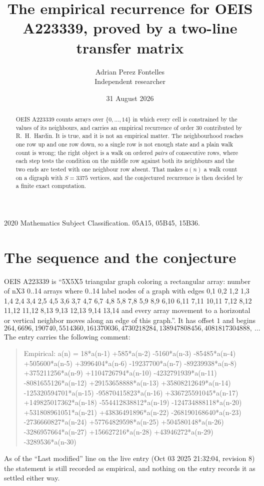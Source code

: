 \documentclass[11pt,a4paper]{article}
\title{The empirical recurrence for OEIS A223339, proved by a two-line transfer matrix}
\author{Adrian Perez Fontelles\\ \small Independent researcher}
\date{31 August 2026}
\theoremstyle{plain}
\theoremstyle{definition}
\begin{document}
\maketitle

\begin{abstract}
OEIS A223339 counts arrays over $\{0,\dots,14\}$ in which every cell is constrained by the
values of its neighbours, and carries an empirical recurrence of order $30$ contributed
by R.~H.~Hardin. It is true, and it is not an empirical matter. The neighbourhood reaches one
row up and one row down, so a single row is not enough state and a plain walk count
is wrong; the right object is a walk on ordered \emph{pairs} of consecutive rows, where
each step tests the condition on the middle row against both its neighbours and the two
ends are tested with one neighbour row absent. That makes $a(n)$ a walk count on a digraph
with $S=3375$ vertices, and the conjectured recurrence is then decided by a finite exact
computation.
\end{abstract}

\noindent\small 2020 Mathematics Subject Classification. 05A15, 05B45, 15B36.\normalsize

\section{The sequence and the conjecture}

OEIS A223339 is ``5X5X5 triangular graph coloring a rectangular array: number of nX3 0..14 arrays where 0..14 label nodes of a graph with edges 0,1 0,2 1,2 1,3 1,4 2,4 3,4 2,5 4,5 3,6 3,7 4,7 6,7 4,8 5,8 7,8 5,9 8,9 6,10 6,11 7,11 10,11 7,12 8,12 11,12 11,12 8,13 9,13 12,13 9,14 13,14 and every array movement to a horizontal or vertical neighbor moves along an edge of this graph.''. It has offset $1$ and begins
\[
264, 6696, 190740, 5514360, 161370036, 4730218284, 138947808456, 4081817304888,\ \dots
\]
The entry carries the following comment:
\begin{quote}\small
Empirical: a(n) = 18*a(n-1) +585*a(n-2) -5160*a(n-3) -85485*a(n-4) +505600*a(n-5) +3996404*a(n-6) -19237700*a(n-7) -89239938*a(n-8) +375211256*a(n-9) +1104726794*a(n-10) -4232791939*a(n-11) -8081655126*a(n-12) +29153658888*a(n-13) +35808212649*a(n-14) -125320594701*a(n-15) -95870415823*a(n-16) +336725591045*a(n-17) +149825017362*a(n-18) -554412838812*a(n-19) -124734888118*a(n-20) +531808961051*a(n-21) +43836491896*a(n-22) -268190168640*a(n-23) -2736660827*a(n-24) +57764829598*a(n-25) +504580148*a(n-26) -3286957664*a(n-27) +156627216*a(n-28) +43946272*a(n-29) -3289536*a(n-30)
\end{quote}
As of the ``Last modified'' line on the live entry (Oct 03 2025 21:32:04, revision 8) the statement is
still recorded as empirical, and nothing on the entry records it as settled either way.
\end{document}
